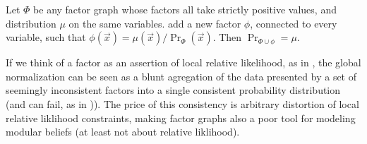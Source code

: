 \documentclass{article}
\theoremstyle{plain}
\theoremstyle{definition}
\newenvironment{example}
	{\pushQED{\qed}\renewcommand{\qedsymbol}{$\triangle$}\examplex}
	{\popQED\endexamplex%
}
\theoremstyle{remark}
\numberwithin{equation}{section}
\begin{document}
	\begin{example}\label{ex:fg-volatile-2}
		Let $\Phi$ be any factor graph whose factors all take strictly positive values, and distribution $\mu$ on the same variables. add a new factor $\phi$, connected to every variable, such that $\phi(\vec x) = {\mu(\vec x)}/{\Pr_\Phi(\vec x)}$. Then $\Pr_{\Phi \cup \phi} = \mu$. 
	\end{example}

	If we think of a factor as an assertion of local relative likelihood, as in , the global normalization can be seen as a blunt agregation of the data presented by a set of seemingly inconsistent factors into a single consistent probability distribution (and can fail, as in )). The price of this consistency is arbitrary distortion of local relative liklihood constraints, making factor graphs also a poor tool for modeling modular beliefs (at least not about relative liklihood). 
	
\end{document}
